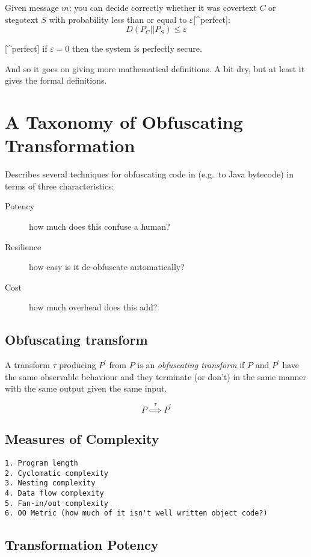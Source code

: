 Given message $m$: you can decide correctly whether it was covertext $C$
or stegotext $S$ with probability less than or equal to
$ε${[}\^{}perfect{]}: \[D(P_C || P_S) ≤  ε\]

{[}\^{}perfect{]} if $ε = 0$ then the system is perfectly secure.

And so it goes on giving more mathematical definitions. A bit dry, but
at least it gives the formal definitions.

\section{A Taxonomy of Obfuscating Transformation\citep{Collberg1997}}

Describes several techniques for obfuscating code in (e.g.~to Java
bytecode) in terms of three characteristics:

\begin{description}
\item[Potency]
how much does this confuse a human?
\item[Resilience]
how easy is it de-obfuscate automatically?
\item[Cost]
how much overhead does this add?
\end{description}
\subsection{Obfuscating transform}

A transform $τ$ producing $P^\prime$ from $P$ is an \emph{obfuscating
transform} if $P$ and $P^\prime$ have the same observable behaviour and
they terminate (or don't) in the same manner with the same output given
the same input.

\[P \overset{τ}{\implies} P^\prime\]

\subsection{Measures of Complexity}

\begin{verbatim}
1. Program length
2. Cyclomatic complexity
3. Nesting complexity
4. Data flow complexity
5. Fan-in/out complexity
6. OO Metric (how much of it isn't well written object code?)
\end{verbatim}
\subsection{Transformation Potency}

